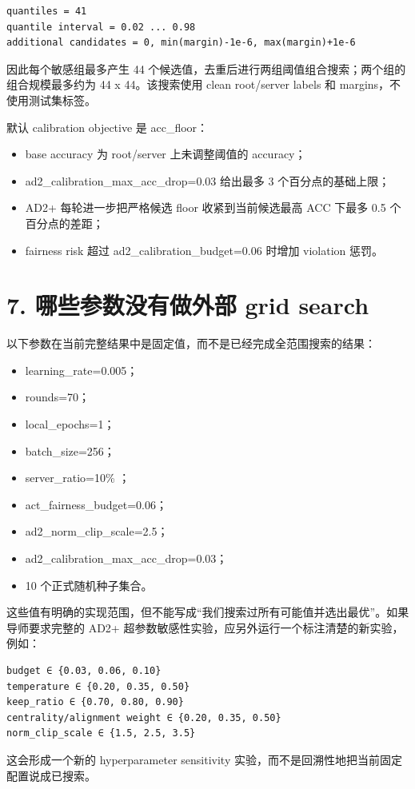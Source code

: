 \documentclass[UTF8,a4paper,10pt]{ctexart}
\begin{document}
\begin{lstlisting}
quantiles = 41
quantile interval = 0.02 ... 0.98
additional candidates = 0, min(margin)-1e-6, max(margin)+1e-6
\end{lstlisting}
因此每个敏感组最多产生 44 个候选值，去重后进行两组阈值组合搜索；两个组的组合规模最多约为 44 x 44。该搜索使用 clean root/server labels 和 margins，不使用测试集标签。

默认 calibration objective 是 acc\_floor：

\begin{itemize}
\item base accuracy 为 root/server 上未调整阈值的 accuracy；
\item ad2\_calibration\_max\_acc\_drop=0.03 给出最多 3 个百分点的基础上限；
\item AD2+ 每轮进一步把严格候选 floor 收紧到当前候选最高 ACC 下最多 0.5 个百分点的差距；
\item fairness risk 超过 ad2\_calibration\_budget=0.06 时增加 violation 惩罚。
\end{itemize}
\section{7. 哪些参数没有做外部 grid search}
以下参数在当前完整结果中是固定值，而不是已经完成全范围搜索的结果：

\begin{itemize}
\item learning\_rate=0.005；
\item rounds=70；
\item local\_epochs=1；
\item batch\_size=256；
\item server\_ratio=10\% ；
\item act\_fairness\_budget=0.06；
\item ad2\_norm\_clip\_scale=2.5；
\item ad2\_calibration\_max\_acc\_drop=0.03；
\item 10 个正式随机种子集合。
\end{itemize}
这些值有明确的实现范围，但不能写成“我们搜索过所有可能值并选出最优”。如果导师要求完整的 AD2+ 超参数敏感性实验，应另外运行一个标注清楚的新实验，例如：

\begin{lstlisting}
budget ∈ {0.03, 0.06, 0.10}
temperature ∈ {0.20, 0.35, 0.50}
keep_ratio ∈ {0.70, 0.80, 0.90}
centrality/alignment weight ∈ {0.20, 0.35, 0.50}
norm_clip_scale ∈ {1.5, 2.5, 3.5}
\end{lstlisting}
这会形成一个新的 hyperparameter sensitivity 实验，而不是回溯性地把当前固定配置说成已搜索。
\end{document}
